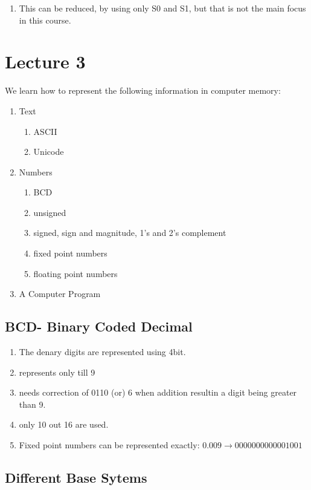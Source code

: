 \documentclass[11pt, a4paper]{article}
\begin{document}
\begin{enumerate}
\begin{figure}[H]
    \end{figure}
    \item This can be reduced, by using only S0 and S1, but that is not the main focus in this course.
\end{enumerate}

\section{Lecture 3}

We learn how to represent the following information in computer memory:
\begin{enumerate}
    \item Text
    \begin{enumerate}
        \item ASCII
        \item Unicode
    \end{enumerate}
    \item Numbers
    \begin{enumerate}
        \item BCD
        \item unsigned
        \item signed, sign and magnitude, 1's and 2's complement
        \item fixed point numbers
        \item floating point numbers
    \end{enumerate}
    \item A Computer Program
\end{enumerate}

\subsection{BCD- Binary Coded Decimal}
\begin{enumerate}
    \item The denary digits are represented using 4bit.
    \item represents only till 9
    \item needs correction of 0110 (or) 6 when addition resultin a digit being greater than 9.
    \item only 10 out 16 are used.
    \item Fixed point numbers can be represented exactly:
    $0.009 \to 0000 0000 0000 1001$
\end{enumerate}

\subsection{Different Base Sytems}
\end{document}
